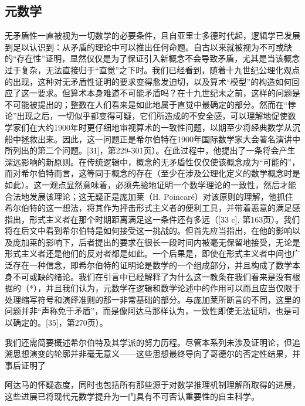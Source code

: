 \subsection*{元数学}

无矛盾性一直被视为一切数学的必要条件，且自亚里士多德时代起，逻辑学已发展到足以认识到：从矛盾的理论中可以推出任何命题。自古以来就被视为不可或缺的“存在性”证明，显然仅仅是为了保证引入新概念不会导致矛盾，尤其是当该概念过于复杂，无法直接归于“直觉”之下时。我们已经看到，随着十九世纪公理化观点的出现，这种对无矛盾性证明的要求变得愈发迫切，以及算术“模型”的构造如何回应了这一要求。但算术本身难道不可能矛盾吗？在十九世纪末之前，这样的问题是不可能被提出的；整数在人们看来是如此地属于直觉中最确定的部分。然而在“悖论”出现之后，一切似乎都变得可疑，它们所造成的不安全感，可以理解地促使数学家们在大约1900年时更仔细地审视算术的一致性问题，以期至少将经典数学从沉船中拯救出来。因此，这一问题正是希尔伯特在1900年国际数学家大会著名演讲中所列出的第二个问题。{[}31{]}，第229-301页）。在此过程中，他提出了一条将会产生深远影响的新原则。在传统逻辑中，概念的无矛盾性仅仅使该概念成为“可能的”，而对希尔伯特而言，这等同于概念的存在（至少在涉及公理化定义的数学概念时是如此）。这一观点显然意味着，必须先验地证明一个数学理论的一致性，然后才能合法地发展该理论；这无疑正是庞加莱（H. Poincaré）对该原则的理解，他抓住希尔伯特的这一想法，将其作为抨击形式主义者的便利工具，并带着恶意的满足感指出，形式主义者在那个时期距离满足这一条件还有多远（{[}33 c{]}, 第163页）。我们将在后文中看到希尔伯特是如何接受这一挑战的。但首先应当指出，在他的影响以及庞加莱的影响下，后者提出的要求在很长一段时间内被毫无保留地接受，无论是形式主义者还是他们的反对者都是如此。一个后果是，即使在形式主义者中间也广泛存在一种信念，即希尔伯特的证明论是数学的一个组成部分，并且构成了数学本身不可或缺的绪论。我们在引言中已经解释了为什么这一教条在我们看来是没有根据的（*），并且我们认为，元数学在逻辑和数学论述中的作用可以而且应当仅限于处理缩写符号和演绎准则的那一非常基础的部分。与庞加莱所断言的不同，这里的问题并非“声称免于矛盾”，而是像阿达马那样认为，一致性即使无法证明，也是可以确定的。{[}35{]}，第270页）。

我们还需简要概述希尔伯特及其学派的努力历程。尽管本系列未涉及证明论，但追溯思想演变的轮廓并非毫无意义——这些思想最终导向了哥德尔的否定性结果，并事后证明了

阿达马的怀疑态度，同时也包括所有那些源于对数学推理机制理解所取得的进展，这些进展已将现代元数学提升为一门具有不可否认重要性的自主科学。

